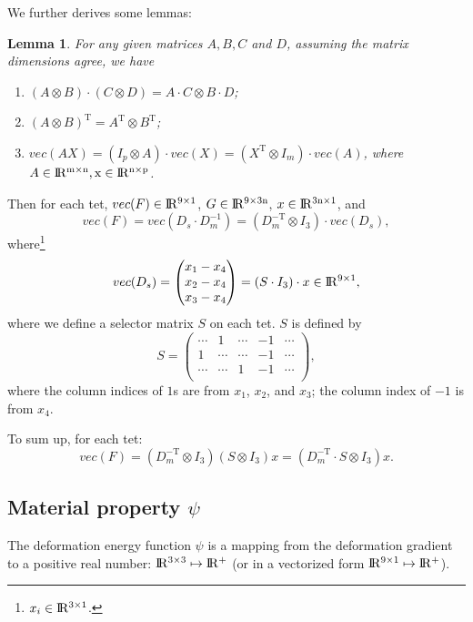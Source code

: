 \documentclass{fancydoc}
\newtheorem{lemma}{Lemma}
\newcommand{\trans}{\mathrm{T}}
\newcommand{\realR}{\rm I\!R}
\begin{document}
We further derives some lemmas:
\begin{lemma}
	For any given matrices $A, B, C$ and $D$, assuming the matrix dimensions agree, we have 
	\begin{enumerate}
		\item $(A \otimes B) \cdot (C \otimes D) = A \cdot C \otimes B \cdot D$;
		\item $(A \otimes B)^\trans  = A^\trans \otimes B^\trans$;
		\item $vec(AX) = (I_p \otimes A) \cdot vec(X) = (X^\trans \otimes I_m) \cdot vec(A)$, where $A \in \realR^{m \times n}, x \in \realR^{n \times p}$.
	\end{enumerate}
\end{lemma}
Then for each tet, $vec(F) \in \realR^{9 \times 1}$, $G \in \realR^{9 \times 3n}$, $x \in \realR^{3n \times 1}$, and
\begin{equation}
	vec(F)  = vec(D_s \cdot D_m^{-1}) = (D_m^{-\trans} \otimes I_3) \cdot vec(D_s),
\end{equation}
where\footnote{$x_i \in \realR^{3 \times 1}$. }
\begin{equation}
vec(D_s) = \begin{pmatrix}
x_1 - x_4 \\
x_2 - x_4 \\
x_3 - x_4
\end{pmatrix}  = (S \cdot I_3) \cdot x \in \realR^{9 \times 1}, 
\end{equation}
where we define a selector matrix $S$ on each tet. $S$ is defined by
\begin{equation}
	S = \begin{pmatrix}
	\cdots & 1 & \cdots & -1  & \cdots \\
	1 & \cdots  & \cdots  & -1 & \cdots \\
	  \cdots  &  \cdots & 1 & -1 & \cdots \\
	\end{pmatrix},
\end{equation}
where the column indices of $1$s are from $x_1$, $x_2$, and $x_3$; the column index of $-1$ is from $x_4$.

To sum up, for each tet:
\begin{equation}
vec(F) = (D_m^{-\trans} \otimes I_3) ( S \otimes I_3) x = (D_m^{-\trans} \cdot S \otimes I_3) x.
\end{equation}

\subsection{Material property $\psi$}
The deformation energy function $\psi$ is a mapping from the deformation gradient to a positive real number: $\realR^{3\times 3} \mapsto \realR^+$ (or in a vectorized form $\realR^{9 \times 1} \mapsto \realR^+$).
\end{document}
